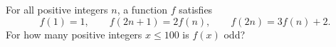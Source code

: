 For all positive integers $n$, a function $f$ satisfies
\[f(1)=1,\qquad f(2n+1)=2f(n),\qquad f(2n)=3f(n)+2 .\]
For how many positive integers $x\le100$ is $f(x)$ odd?
